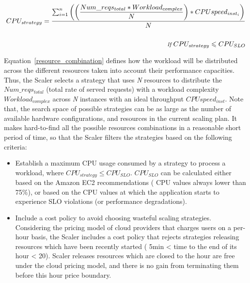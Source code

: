 

{\scriptsize
\begin{equation}\label{resource_combination}
\begin{split}
CPU_{strategy} = \dfrac{ \sum_{i=1}^n \bigg( \bigg( \dfrac{ Num\_reqs_{total} * Workload_{complex} }  {N}  \bigg) * CPU speed_{inst_{i}} \bigg) }  {N} \\ 
\\ {\small \textit{ If } CPU_{strategy} \leqslant CPU_{SLO} }
\end{split}
\end{equation}
}

Equation~\ref{resource_combination} defines how the workload will be distributed across the different resources taken into account their performance capacities.  Thus, the Scaler selects a strategy that uses \emph{N} resources to distribute the \emph{$Num\_reqs_{total}$} (total rate of served requests) with a workload complexity \emph{$Workload_{complex}$} across \emph{N} instances with an ideal throughput \emph{$CPUspeed_{inst}$}. Note that, the search space of possible strategies can be as large as the number of available hardware configurations, and resources in the current scaling plan. It makes hard-to-find all the possible resources combinations in a reasonable short period of time, so that the Scaler filters the strategies based on the following criteria:
\begin{itemize}
\item Establish a maximum CPU usage consumed by a strategy to process a workload, where \emph{$CPU_{strategy} \leq CPU_{SLO}$}. \emph{$CPU_{SLO}$} can be calculated either based on the Amazon EC2 recommendations ( CPU values always lower than 75\%), or based on the CPU values at which the application starts to experience SLO violations (or performance degradations). 

\item Include a cost policy to avoid choosing wasteful scaling strategies. Considering the pricing model of cloud providers that charges users on a per-hour basis, the Scaler includes a cost policy that rejects strategies releasing resources which have been recently started ( 5min < time to the end of its hour < 20). Scaler releases resources which are closed to the hour are free under the cloud pricing model, and there is no gain from terminating them before this hour price boundary.

\end{itemize}


